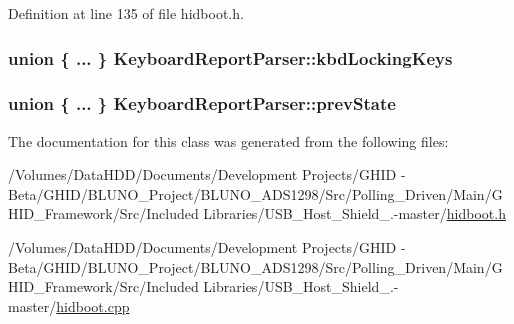 \-Definition at line 135 of file hidboot.\-h.

\hypertarget{class_keyboard_report_parser_a8a8bd1a171e6b17d1c6db04cedeeff44}{
\subsubsection[{kbd\-Locking\-Keys}]{\setlength{\rightskip}{0pt plus 5cm}union \{ ... \}   {\bf \-Keyboard\-Report\-Parser\-::kbd\-Locking\-Keys}}}\label{class_keyboard_report_parser_a8a8bd1a171e6b17d1c6db04cedeeff44}
\hypertarget{class_keyboard_report_parser_af11da7bfeaff2505a36aa68abb0984f1}{
\subsubsection[{prev\-State}]{\setlength{\rightskip}{0pt plus 5cm}union \{ ... \}   {\bf \-Keyboard\-Report\-Parser\-::prev\-State}}}\label{class_keyboard_report_parser_af11da7bfeaff2505a36aa68abb0984f1}


\-The documentation for this class was generated from the following files\-:\begin{DoxyCompactItemize}
\item 
/\-Volumes/\-Data\-H\-D\-D/\-Documents/\-Development Projects/\-G\-H\-I\-D -\/ Beta/\-G\-H\-I\-D/\-B\-L\-U\-N\-O\-\_\-\-Project/\-B\-L\-U\-N\-O\-\_\-\-A\-D\-S1298/\-Src/\-Polling\-\_\-\-Driven/\-Main/\-G\-H\-I\-D\-\_\-\-Framework/\-Src/\-Included Libraries/\-U\-S\-B\-\_\-\-Host\-\_\-\-Shield\-\_.-\/master/\hyperlink{hidboot_8h}{hidboot.\-h}\item 
/\-Volumes/\-Data\-H\-D\-D/\-Documents/\-Development Projects/\-G\-H\-I\-D -\/ Beta/\-G\-H\-I\-D/\-B\-L\-U\-N\-O\-\_\-\-Project/\-B\-L\-U\-N\-O\-\_\-\-A\-D\-S1298/\-Src/\-Polling\-\_\-\-Driven/\-Main/\-G\-H\-I\-D\-\_\-\-Framework/\-Src/\-Included Libraries/\-U\-S\-B\-\_\-\-Host\-\_\-\-Shield\-\_.-\/master/\hyperlink{hidboot_8cpp}{hidboot.\-cpp}\end{DoxyCompactItemize}
